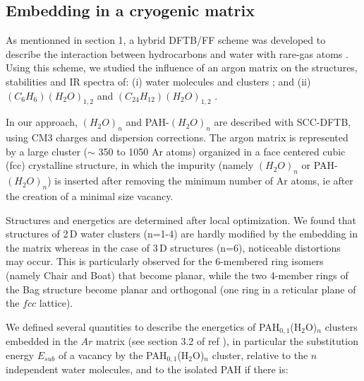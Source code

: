 \documentclass[]{interact}
\theoremstyle{plain}%
\theoremstyle{definition}
\theoremstyle{remark}
\begin{document}
		
		

\subsection{ Embedding in a cryogenic matrix }
As mentionned in section 1, a hybrid DFTB/FF scheme was developed to describe the interaction between hydrocarbons and water with rare-gas atoms \cite{Iftner_JCP2014,WaterMat_JPCA2015}. Using this scheme, we studied the influence of an argon matrix on the structures, stabilities and IR spectra of: (i)  water molecules and clusters \cite{WaterMat_JPCA2015} ; and (ii) $(C_{6}H_{6})(H_{2}O)_{1,2}$ and   $(C_{24}H_{12})(H_{2}O)_{1,2}$   \cite{WaterCorMat_PCCP17}.

In our approach, $(H_{2}O)_{n}$  and PAH-$(H_{2}O)_{n}$ are described with SCC-DFTB, using CM3 charges and dispersion corrections. The argon matrix is represented by a large cluster ($\sim$ 350 to 1050 Ar atoms) organized in a face centered cubic (fcc) crystalline structure, in which the impurity (namely $(H_{2}O)_{n}$  or  PAH-$(H_{2}O)_{n}$) is inserted after removing the minimum number of Ar atoms, ie after the creation of a minimal size vacancy.

Structures and energetics are determined after local optimization. 
We found that  structures of 2\,D water clusters (n=1-4) are hardly modified by the embedding in the matrix whereas in the case of 3\,D structures (n=6), noticeable distortions may occur. This is particularly observed for  the 6-membered ring isomers (namely Chair and Boat) that become planar, while the two 4-member rings of the Bag structure become planar and orthogonal (one ring in a reticular plane of the $fcc$ lattice).

We defined several quantities to  describe the energetics of PAH$_{0,1}$(H$_2$O)$_n$ clusters embedded in the $Ar$ matrix (see section 3.2 of ref  \cite{WaterMat_JPCA2015}), in particular the substitution energy  $E_{sub}$ of a vacancy by the  PAH$_{0,1}$(H$_2$O)$_n$  cluster, relative to the $n$ independent water molecules, and to the isolated PAH if there is: 
\end{document}

